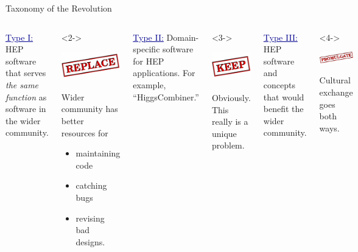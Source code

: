 \documentclass[aspectratio=169]{beamer}
\begin{document}
\begin{frame}{Taxonomy of the Revolution}
\vspace{0.25 cm}
\begin{columns}[t]
\textcolor{darkblue}{\underline{Type I:}} HEP software that serves {\it the same function} as software in the wider community.

\begin{uncoverenv}<2->
\begin{center}
\includegraphics[height=1.5 cm]{stamp_replace.png}
\end{center}

Wider community has better resources for
\begin{itemize}
\item maintaining code
\item catching bugs
\item revising bad designs.
\end{itemize}
\end{uncoverenv}

\textcolor{darkblue}{\underline{Type II:}} Domain-specific software for HEP applications. For example, ``HiggsCombiner.''

\begin{uncoverenv}<3->
\begin{center}
\includegraphics[height=1.5 cm]{stamp_keep.png}
\end{center}

Obviously. This really is a unique problem.
\end{uncoverenv}

\textcolor{darkblue}{\underline{Type III:}} HEP software and concepts that would benefit the wider community. \\ \mbox{ }

\begin{uncoverenv}<4->
\begin{center}
\includegraphics[height=1.5 cm]{stamp_promulgate.png}
\end{center}

Cultural exchange goes both ways.
\end{uncoverenv}
\end{columns}
\end{frame}
\end{document}
